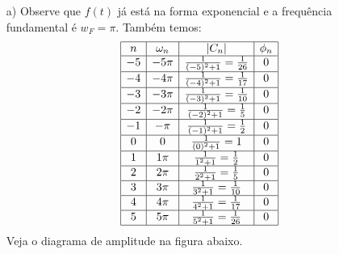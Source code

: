\begin{resp} 
\begin{itemize}
\item [a)] Observe que $f(t)$ já está na forma exponencial e a frequência fundamental é $w_F=\pi$. Também temos:
\begin{equation}
\begin{array}{|c|c|c|c|}
\hline
n&\omega_n&|C_n|&\phi_n\\
\hline
-5&-5\pi &\frac{1}{(-5)^2+1}=\frac{1}{26}&0\\
\hline
-4&-4\pi &\frac{1}{(-4)^2+1}=\frac{1}{17}&0\\
\hline
-3&-3\pi &\frac{1}{(-3)^2+1}=\frac{1}{10}&0\\
\hline
-2&-2\pi &\frac{1}{(-2)^2+1}=\frac{1}{5}&0\\
\hline
-1&-\pi &\frac{1}{(-1)^2+1}=\frac{1}{2}&0\\
\hline
0&0 &\frac{1}{(0)^2+1}=1&0\\
\hline
1&1\pi &\frac{1}{1^2+1}=\frac{1}{2}&0\\
\hline
2&2\pi &\frac{1}{2^2+1}=\frac{1}{5}&0\\
\hline
3&3\pi &\frac{1}{3^2+1}=\frac{1}{10}&0\\
\hline
4&4\pi &\frac{1}{4^2+1}=\frac{1}{17}&0\\
\hline
5&5\pi &\frac{1}{5^2+1}=\frac{1}{26}&0\\
\hline
\end{array}
\end{equation}
Veja o diagrama de amplitude na figura abaixo.


\end{itemize}
\end{resp}
